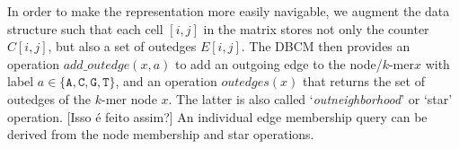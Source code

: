 \documentclass[a4paper,12pt]{article}
\newcommand{\dBG}{de~Bruijn graph\xspace}
\newcommand{\cm}{CountMin\xspace}
\newcommand{\kmer}{\mbox{$k$-mer}\xspace}
\newcommand{\chr}[1]{\ensuremath{\mathtt{#1}}}
\newcommand{\A}{\chr{A}}
\newcommand{\C}{\chr{C}}
\newcommand{\G}{\chr{G}}
\newcommand{\T}{\chr{T}}
\newcommand{\todo}[2][]{\color{red} [#1] #2 \color{black}}
\newcommand{\toconsider}[1]{\color{blue} #1 \color{black}}
\newcommand{\asq}[1]{\color{red}$\rightarrow$ asq says: #1 $\leftarrow$ \color{black}}
\begin{document}




In order to make the representation more easily navigable, we augment the data structure such that each cell $[i,j]$ in the matrix stores not only the counter $C[i,j]$, but also a set of outedges $E[i,j]$. The DBCM then provides an operation $add\_outedge(x,a)$ to add an outgoing edge to the node/\kmer $x$ with label $a\in\{\A,\C,\G,\T\}$, and an operation $outedges(x)$ that returns the set of outedges of the \kmer node $x$. The latter is also called `\emph{outneighborhood}' or `star' operation. \todo[Isso é feito assim?]{An individual edge membership query can be derived from the node membership and star operations.}
\end{document}
